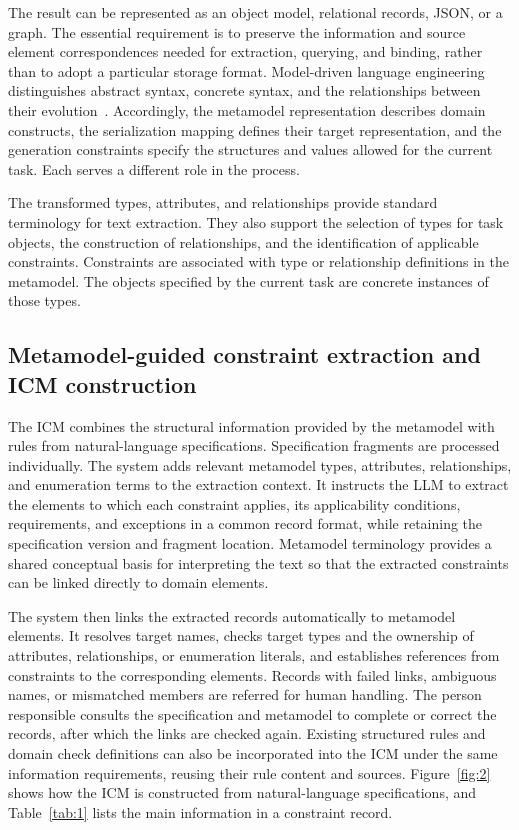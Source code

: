 \documentclass[pdflatex,iicol,sn-mathphys-num]{sn-jnl}
\newcommand{\paperref}[1]{~\citep{#1}}
\begin{document}
The result can be represented as an object model, relational records, JSON, or a graph. The essential requirement is to preserve the information and source element correspondences needed for extraction, querying, and binding, rather than to adopt a particular storage format. Model-driven language engineering distinguishes abstract syntax, concrete syntax, and the relationships between their evolution\paperref{Tolvanen2025}. Accordingly, the metamodel representation describes domain constructs, the serialization mapping defines their target representation, and the generation constraints specify the structures and values allowed for the current task. Each serves a different role in the process.


The transformed types, attributes, and relationships provide standard terminology for text extraction. They also support the selection of types for task objects, the construction of relationships, and the identification of applicable constraints. Constraints are associated with type or relationship definitions in the metamodel. The objects specified by the current task are concrete instances of those types.


\subsection{Metamodel-guided constraint extraction and ICM construction}\label{sec:method-3-3}

The ICM combines the structural information provided by the metamodel with rules from natural-language specifications. Specification fragments are processed individually. The system adds relevant metamodel types, attributes, relationships, and enumeration terms to the extraction context. It instructs the LLM to extract the elements to which each constraint applies, its applicability conditions, requirements, and exceptions in a common record format, while retaining the specification version and fragment location. Metamodel terminology provides a shared conceptual basis for interpreting the text so that the extracted constraints can be linked directly to domain elements.


The system then links the extracted records automatically to metamodel elements. It resolves target names, checks target types and the ownership of attributes, relationships, or enumeration literals, and establishes references from constraints to the corresponding elements. Records with failed links, ambiguous names, or mismatched members are referred for human handling. The person responsible consults the specification and metamodel to complete or correct the records, after which the links are checked again. Existing structured rules and domain check definitions can also be incorporated into the ICM under the same information requirements, reusing their rule content and sources. Figure~\ref{fig:2} shows how the ICM is constructed from natural-language specifications, and Table~\ref{tab:1} lists the main information in a constraint record.
\end{document}
